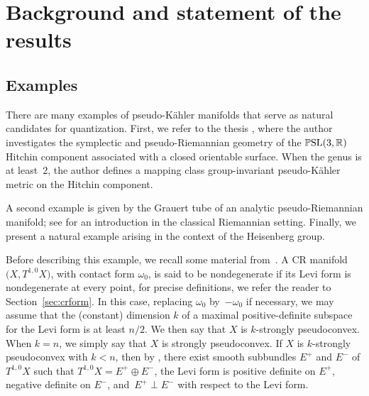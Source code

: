 \documentclass[10pt,a4paper]{amsart}
\numberwithin{equation}{section}
\begin{document}
\section{Background and statement of the results}	 \label{sec:for}
	
\subsection{Examples}
	 There are many examples of pseudo-K\"ahler manifolds that serve as natural candidates for quantization. First, we refer to the thesis \cite{rungi}, where the author investigates the symplectic and pseudo-Riemannian geometry of the $\mathbb{P}{\rm SL}(3,\mathbb{R})$ Hitchin component associated with a closed orientable surface. When the genus is at least~$2$, the author defines a mapping class group-invariant pseudo-K\"ahler metric on the Hitchin component.
	
	 A second example is given by the Grauert tube of an analytic pseudo-Riemannian manifold; see \cite{z} for an introduction in the classical Riemannian setting. Finally, we present a natural example arising in the context of the Heisenberg group.
	
	 Before describing this example, we recall some material from~\cite{fs}. A CR manifold $\bigl(X, T^{1,0}X\bigr)$, with contact form $\omega_0$, is said to be nondegenerate if its Levi form is nondegenerate at every point, for precise definitions, we refer the reader to Section~\ref{sec:crform}. In this case, replacing $\omega_0$ by~$-\omega_0$ if necessary, we may assume that the (constant) dimension $k$ of a maximal positive-definite subspace for the Levi form is at least $n/2$. We then say that $X$ is $k$-strongly pseudoconvex. When $k = n$, we simply say that $X$ is strongly pseudoconvex. If $X$ is $k$-strongly pseudoconvex with $k < n$, then by \cite[Lemma 13.1]{fs}, there exist smooth subbundles $E^+$ and $E^-$ of $T^{1,0}X$ such that $T^{1,0}X=E^+\oplus E^-$, the Levi form is positive definite on $E^+$, negative definite on $E^-$, and~${E^+ \perp E^-}$ with respect to the Levi form.
	
\end{document}
